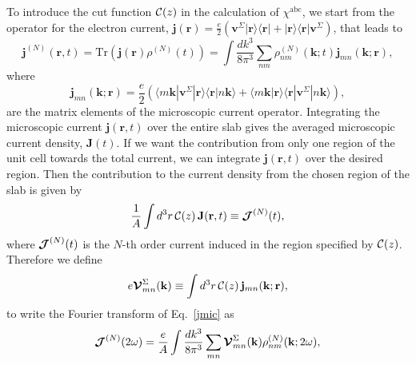 \documentclass[floatfix,prb,aps,superscriptaddress,showpacs,letterpaper]{revtex4}
\begin{document}
To introduce the
cut function ${\mathbf{\cal C}}(z)$ in
the calculation of $\chi^{\mathrm{a}\mathrm{b}\mathrm{c}}$, we start from 
the operator for the electron current,
$\mathbf{j}(\mathbf{r})=\frac{e}{2}\left(\mathbf{v}^\Sigma | \mathbf{r}\rangle\langle\mathbf{r} |
+ | \mathbf{r}\rangle\langle\mathbf{r} | \mathbf{v}^\Sigma\right)$, that leads to
\begin{equation}
\mathbf{j}^{(N)}(\mathbf{r},t)=\mathrm{Tr}(\mathbf{j}(\mathbf{r})\rho^{(N)}(t))
=
\int \frac{dk^3}{8\pi^3}
\sum_{nm}
\rho^{(N)}_{nm}(\mathbf{k};t)\mathbf{j}_{mn}(\mathbf{k};\mathbf{r})
,
\label{jmic}
\end{equation}
where 
\begin{equation}
\mathbf{j}_{mn}(\mathbf{k};\mathbf{r})=
\frac{e}{2}
\left(
\langle m\mathbf{k} | \mathbf{v}^\Sigma | \mathbf{r}\rangle \langle\mathbf{r}|n\mathbf{k}\rangle
+
\langle m\mathbf{k}|\mathbf{r}\rangle\langle\mathbf{r} | \mathbf{v}^\Sigma | n\mathbf{k}\rangle
\right),
\label{jmic3}
\end{equation}
are the matrix elements of the microscopic current operator.
Integrating the microscopic current $\mathbf{j}(\mathbf{r},t)$ over
the entire slab gives the averaged microscopic current density, $\mathbf{J}(t)$. 
If we want the contribution from only one region of the unit cell 
towards the total current, we can integrate $\mathbf{j}({\mathbf r},t)$ 
over the desired region. Then the contribution 
to the current density from the
chosen region of the slab is given by
\begin{equation*}
\frac{1}{A}\int d^3r\, {\mathbf{\cal C}}(z)\, 
\mathbf{J} (\mathbf{r},t)
 \equiv \boldsymbol{\mathcal{\cal J}}^{(N)}(t),
\end{equation*}
where $\boldsymbol{\mathcal{\cal J}}^{(N)}(t)$ is the $N$-th order current induced in the
region specified by ${\mathbf{\cal C}}(z)$.
Therefore we define
\begin{equation}
e{\boldsymbol{\mathcal{V}}}^{\Sigma}_{mn}(\mathbf{k})
\equiv
\int d^3r\, {\mathbf{\cal C}}(z)\,\mathbf{j}_{mn}({\mathbf{k}};\mathbf{r}),
\label{vcal}
\end{equation}
to write the Fourier transform of Eq.~\eqref{jmic} as
\begin{equation}
\boldsymbol{\mathcal{\cal J}}^{(N)}(2\omega)=\frac{e}{A}
\int \frac{dk^3}{8\pi^3}
\sum_{mn}
\boldsymbol{\mathcal{\cal V}}^{\Sigma}_{mn}(\mathbf{k}) 
\rho^{(N)}_{nm}(\mathbf{k};2\omega) 
, 
\label{jmac2}
\end{equation}
\end{document}
